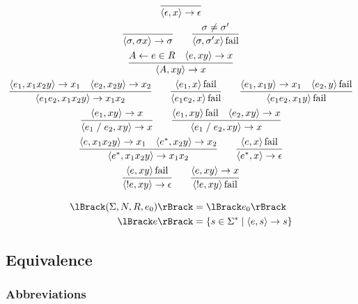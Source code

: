 \begin{gather*}
  \infer{\langle \epsilon, x\rangle \to \epsilon}{}
  \\
  \infer{\langle \sigma, \sigma x\rangle \to \sigma}{}
  \hspace{2em}
  \infer{\langle \sigma, \sigma' x\rangle \symfail}{
    \sigma \neq \sigma'
  }
  \\
  \infer{\langle A, xy\rangle \to x}{
    A \assign e \in R
    &
    \langle e, xy\rangle \to x
  }
  \\
  \infer{\langle e_1e_2, x_1x_2y\rangle \to x_1x_2}{
    \langle e_1, x_1x_2y\rangle \to x_1
    &
    \langle e_2, x_2y\rangle \to x_2
  }
  \hspace{2em}
  \infer{\langle e_1e_2, x\rangle \symfail}{
    \langle e_1, x\rangle \symfail
  }
  \hspace{2em}
  \infer{\langle e_1e_2, x_1y\rangle \symfail}{
    \langle e_1, x_1y\rangle \to x_1
    &
    \langle e_2, y\rangle \symfail
  }
  \\
  \infer{\langle e_1 \mathrel{/} e_2, xy\rangle \to x}{
    \langle e_1, xy\rangle \to x
  }
  \hspace{2em}
  \infer{\langle e_1 \mathrel{/} e_2, xy\rangle \to x}{
    \langle e_1, xy\rangle \symfail
    &
    \langle e_2, xy\rangle \to x
  }
  \\
  \infer{\langle e^*, x_1x_2y\rangle \to x_1x_2}{
    \langle e, x_1x_2y\rangle \to x_1
    &
    \langle e^*, x_2y\rangle \to x_2
  }
  \hspace{2em}
  \infer{\langle e^*, x\rangle \to \epsilon}{
    \langle e, x\rangle \symfail
  }
  \\
  \infer{\langle !e, xy\rangle \to \epsilon}{
    \langle e, xy\rangle \symfail
  }
  \hspace{2em}
  \infer{\langle !e, xy\rangle \symfail}{
    \langle e, xy\rangle \to x
  }
\end{gather*}

\begin{align*}
  \semanticf{(\Sigma, N, R, e_0)} &= \semanticf{e_0} \\
  \semanticf{e} &= \{s \in \Sigma^* \mid \langle e, s\rangle \to s\}
\end{align*}

\subsection{Equivalence}

\subsubsection{Abbreviations}

